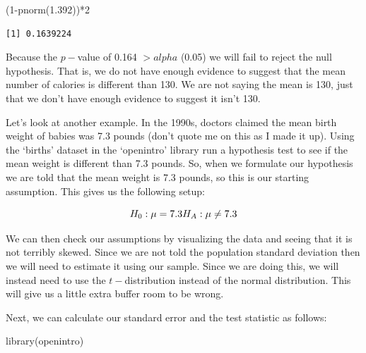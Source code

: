 \documentclass[
  letterpaper,
  DIV=11,
  numbers=noendperiod]{scrreprt}
\newenvironment{Shaded}{\begin{snugshade}}{\end{snugshade}}
\newcommand{\DecValTok}[1]{\textcolor[rgb]{0.68,0.00,0.00}{#1}}
\newcommand{\FloatTok}[1]{\textcolor[rgb]{0.68,0.00,0.00}{#1}}
\newcommand{\FunctionTok}[1]{\textcolor[rgb]{0.28,0.35,0.67}{#1}}
\newcommand{\NormalTok}[1]{\textcolor[rgb]{0.00,0.23,0.31}{#1}}
\newcommand{\OtherTok}[1]{\textcolor[rgb]{0.00,0.23,0.31}{#1}}
\newcommand{\SpecialCharTok}[1]{\textcolor[rgb]{0.37,0.37,0.37}{#1}}
\begin{document}
\begin{Shaded}
\begin{Highlighting}[]
\NormalTok{(}\DecValTok{1}\SpecialCharTok{{-}}\FunctionTok{pnorm}\NormalTok{(}\FloatTok{1.392}\NormalTok{))}\SpecialCharTok{*}\DecValTok{2}
\end{Highlighting}
\end{Shaded}

\begin{verbatim}
[1] 0.1639224
\end{verbatim}

Because the \(p-\)value of 0.164 \(> alpha\) (0.05) we will fail to
reject the null hypothesis. That is, we do not have enough evidence to
suggest that the mean number of calories is different than 130. We are
not saying the mean is 130, just that we don't have enough evidence to
suggest it isn't 130.

Let's look at another example. In the 1990s, doctors claimed the mean
birth weight of babies was 7.3 pounds (don't quote me on this as I made
it up). Using the `births' dataset in the `openintro' library run a
hypothesis test to see if the mean weight is different than 7.3 pounds.
So, when we formulate our hypothesis we are told that the mean weight is
7.3 pounds, so this is our starting assumption. This gives us the
following setup:

\[ H_0: \mu = 7.3 \\ H_A: \mu \neq 7.3\]

We can then check our assumptions by visualizing the data and seeing
that it is not terribly skewed. Since we are not told the population
standard deviation then we will need to estimate it using our sample.
Since we are doing this, we will instead need to use the
\(t-\)distribution instead of the normal distribution. This will give us
a little extra buffer room to be wrong.

Next, we can calculate our standard error and the test statistic as
follows:

\begin{Shaded}
\begin{Highlighting}[]
\FunctionTok{library}\NormalTok{(openintro)}
\end{Highlighting}
\end{Shaded}

\begin{Shaded}
\end{Shaded}
\end{document}
